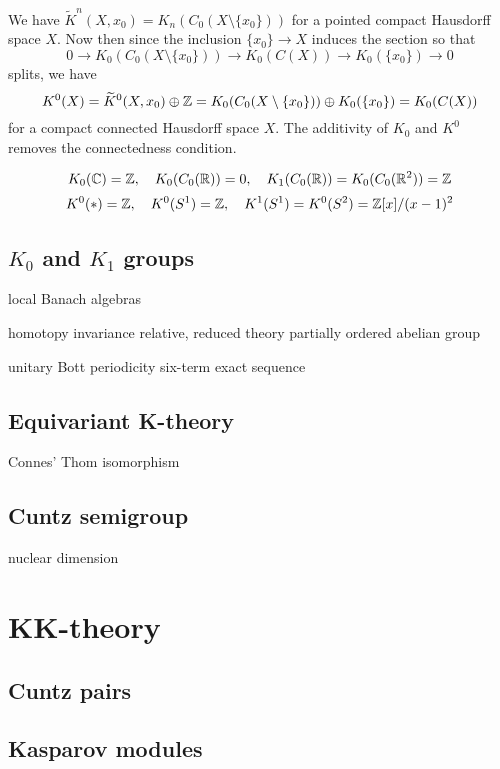 \documentclass{../../large}
\begin{document}
We have $\tilde K^n(X,x_0)=K_n(C_0(X\setminus\{x_0\}))$ for a pointed compact Hausdorff space $X$.
Now then since the inclusion $\{x_0\}\to X$ induces the section so that
\[0\to K_0(C_0(X\setminus\{x_0\}))\to K_0(C(X))\to K_0(\{x_0\})\to0\]
splits, we have
\[K^0(X)=\widetilde K^0(X,x_0)\oplus\mathbb{Z}=K_0(C_0(X\setminus\{x_0\}))\oplus K_0(\{x_0\})=K_0(C(X))\]
for a compact connected Hausdorff space $X$.
The additivity of $K_0$ and $K^0$ removes the connectedness condition.

\[K_0(\mathbb{C})=\mathbb{Z},\quad K_0(C_0(\mathbb{R}))=0,\quad K_1(C_0(\mathbb{R}))=K_0(C_0(\mathbb{R}^2))=\mathbb{Z}\]
\[K^0(*)=\mathbb{Z},\quad K^0(S^1)=\mathbb{Z},\quad K^1(S^1)=K^0(S^2)=\mathbb{Z}[x]/(x-1)^2\]

\section{$K_0$ and $K_1$ groups}

local Banach algebras

homotopy invariance
relative, reduced theory
partially ordered abelian group


unitary
Bott periodicity
six-term exact sequence


\section{Equivariant K-theory}
\begin{prb}
\end{prb}
Connes' Thom isomorphism


\section{Cuntz semigroup}

nuclear dimension




\chapter{KK-theory}

\section{Cuntz pairs}

\section{Kasparov modules}
\end{document}
